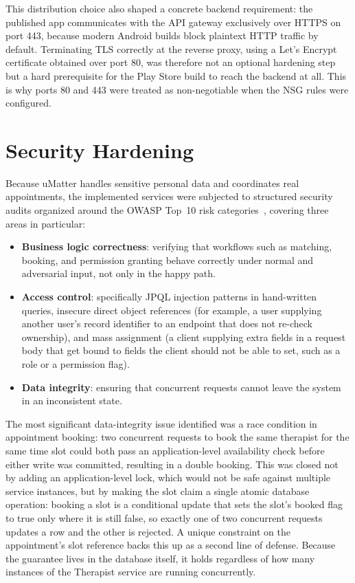 This distribution choice also shaped a concrete backend requirement: the published app communicates with the API gateway exclusively over HTTPS on port 443, because modern Android builds block plaintext HTTP traffic by default. Terminating TLS correctly at the reverse proxy, using a Let's Encrypt certificate obtained over port 80, was therefore not an optional hardening step but a hard prerequisite for the Play Store build to reach the backend at all. This is why ports 80 and 443 were treated as non-negotiable when the NSG rules were configured.

\section{Security Hardening}

Because uMatter handles sensitive personal data and coordinates real appointments, the implemented services were subjected to structured security audits organized around the OWASP Top~10 risk categories~\cite{2021-OWASP-Top10}, covering three areas in particular:

\begin{itemize}
\item \textbf{Business logic correctness}: verifying that workflows such as matching, booking, and permission granting behave correctly under normal and adversarial input, not only in the happy path.
\item \textbf{Access control}: specifically JPQL injection patterns in hand-written queries, insecure direct object references (for example, a user supplying another user's record identifier to an endpoint that does not re-check ownership), and mass assignment (a client supplying extra fields in a request body that get bound to fields the client should not be able to set, such as a role or a permission flag).
\item \textbf{Data integrity}: ensuring that concurrent requests cannot leave the system in an inconsistent state.
\end{itemize}

The most significant data-integrity issue identified was a race condition in appointment booking: two concurrent requests to book the same therapist for the same time slot could both pass an application-level availability check before either write was committed, resulting in a double booking. This was closed not by adding an application-level lock, which would not be safe against multiple service instances, but by making the slot claim a single atomic database operation: booking a slot is a conditional update that sets the slot's booked flag to true only where it is still false, so exactly one of two concurrent requests updates a row and the other is rejected. A unique constraint on the appointment's slot reference backs this up as a second line of defense. Because the guarantee lives in the database itself, it holds regardless of how many instances of the Therapist service are running concurrently.

